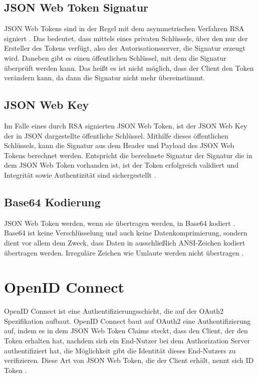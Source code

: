 \subsection{JSON Web Token Signatur}
\label{sec:JSONWebToken:JSONWebTokenSignatur}

JSON Web Tokens sind in der Regel mit dem asymmetrischen Verfahren \ac{RSA} signiert \citep{jwt:2015}. Das bedeutet, dass mittels eines privaten Schlüssels, über den
nur der Ersteller des Tokens verfügt, also der Autorisationsserver, die Signatur erzeugt wird.
Daneben gibt es einen öffentlichen Schlüssel, mit dem die Signatur überprüft werden kann.
Das heißt es ist nicht möglich, dass der Client den Token verändern kann, da dann die
Signatur nicht mehr übereinstimmt.

\subsection{JSON Web Key}
\label{sec:JSONWebToken:JSONWebKey}
Im Falle eines durch RSA signierten JSON Web Token, ist der JSON Web Key der in JSON dargestellte öffentliche Schlüssel. Mithilfe dieses öffentlichen Schlüssels, kann die Signatur aus dem Header und Payload des JSON Web Tokens berechnet werden. Entspricht die berechnete Signatur der Signatur die in dem JSON Web Token vorhanden ist, ist der Token erfolgreich validiert und Integrität sowie Authentizität sind sichergestellt \citep{jwk:2015}.

\subsection{Base64 Kodierung}
\label{sec:JSONWebToken:Base64Kodierung}
JSON Web Token werden, wenn sie übertragen werden, in Base64 kodiert \citep{jwt:2015}. Base64 ist
keine Verschlüsselung und auch keine Datenkomprimierung, sondern dient vor allem dem
Zweck, dass Daten in ausschließlich ANSI-Zeichen kodiert übertragen werden. Irreguläre Zeichen wie Umlaute werden nicht übertragen \citep{base64:2006}. 

\section{OpenID Connect}
\label{sec:OpenIDConnect}
OpenID Connect ist eine Authentifizierungsschicht, die auf der OAuth2 Spezifikation
aufbaut. OpenID Connect baut auf OAuth2 eine Authentifizierung auf, indem es in dem JSON Web Token
Claims steckt, dass den Client, der den Token erhalten hat, nachdem sich ein End-Nutzer bei
dem Authorization Server authentifiziert hat, die Möglichkeit gibt die Identität dieses End-Nutzers zu verifizieren.
Diese Art von JSON Web Token, die der Client erhält, nennt sich ID Token \citep{openidconnect:2014}. 

